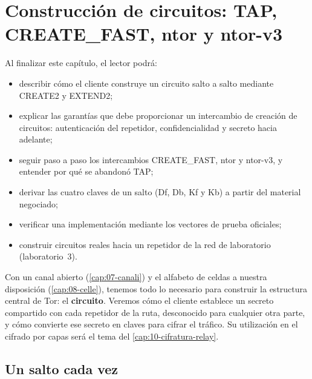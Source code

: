 \chapter{Construcción de circuitos: TAP, CREATE\_FAST, ntor y ntor-v3}\label{cap:09-circuiti}

\begin{obiettivi}
Al finalizar este capítulo, el lector podrá:
\begin{itemize}[nosep]
  \item describir cómo el cliente construye un circuito salto a salto mediante CREATE2 y EXTEND2;
  \item explicar las garantías que debe proporcionar un intercambio de creación de circuitos: autenticación del repetidor, confidencialidad y secreto hacia adelante;
  \item seguir paso a paso los intercambios CREATE\_FAST, ntor y ntor-v3, y entender por qué se abandonó TAP;
  \item derivar las cuatro claves de un salto (Df, Db, Kf y Kb) a partir del material negociado;
  \item verificar una implementación mediante los vectores de prueba oficiales;
  \item construir circuitos reales hacia un repetidor de la red de laboratorio (laboratorio~3).
\end{itemize}
\end{obiettivi}

Con un canal abierto (\cref{cap:07-canali}) y el alfabeto de celdas a nuestra disposición (\cref{cap:08-celle}), tenemos todo lo necesario para construir la estructura central de Tor: el \textbf{circuito}. Veremos cómo el cliente establece un secreto compartido con cada repetidor de la ruta, desconocido para cualquier otra parte, y cómo convierte ese secreto en claves para cifrar el tráfico. Su utilización en el cifrado por capas será el tema del \cref{cap:10-cifratura-relay}.

\section{Un salto cada vez}\label{sec:circ-telescopio}

